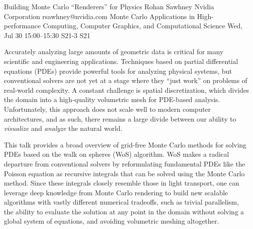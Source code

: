 \begin{talk}
  {Building Monte Carlo ``Renderers'' for Physics}%
  {Rohan Sawhney}%
  {Nvidia Corporation}%
  {rsawhney@nvidia.com}%
  {Monte Carlo Applications in High-performance Computing, Computer Graphics, and Computational Science}%
  {}%
  {Wed, Jul 30 15:00--15:30}%
  {S21-3}%
  {S21}%
    
   
Accurately analyzing large amounts of geometric data is critical for many scientific and engineering applications. Techniques based on partial differential equations (PDEs) provide powerful tools for analyzing physical systems, but conventional solvers are not yet at a stage where they “just work” on problems of real-world complexity. A constant challenge is spatial discretization, which divides the domain into a high-quality volumetric mesh for PDE-based analysis. Unfortunately, this approach does not scale well to modern computer architectures, and as such, there remains a large divide between our ability to \emph{visualize} and \emph{analyze} the natural world.

This talk provides a broad overview of grid-free Monte Carlo methods for solving PDEs based on the walk on spheres (WoS) algorithm. WoS makes a radical departure from conventional solvers by reformulating fundamental PDEs like the Poisson equation as recursive integrals that can be solved using the Monte Carlo method. Since these integrals closely resemble those in light transport, one can leverage deep knowledge from Monte Carlo rendering to build new scalable algorithms with vastly different numerical tradeoffs, such as trivial parallelism, the ability to
evaluate the solution at any point in the domain without solving a global system
of equations, and avoiding volumetric meshing altogether.



\end{talk}

